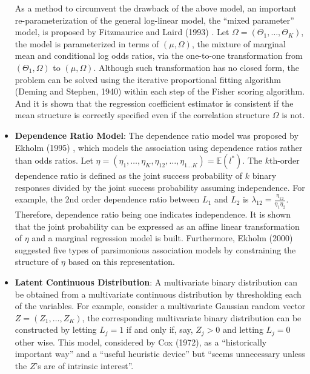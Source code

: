 \documentclass[11 pt, a4paper]{article}  %
\begin{document}
\begin{itemize}
As a method to circumvent the drawback of the above model, an important re-parameterization of the general log-linear model, the ``mixed parameter''  model, is proposed by Fitzmaurice and Laird (1993) \cite{fitzmaurice1993likelihood}. Let $\Omega = (\Theta_1,\ldots, \Theta_K)$, the model is parameterized in terms of $(\mu, \Omega)$, the mixture of marginal mean and conditional log odds ratios, via the one-to-one transformation from $(\Theta_1, \Omega)$ to $(\mu, \Omega)$. Although such transformation has no closed form, the problem can be solved  using the iterative proportional fitting algorithm (Deming and Stephen, 1940) \cite{deming1940least} within each step of the Fisher scoring algorithm. And it is shown that the regression coefficient estimator is consistent if the mean structure is correctly specified even if the correlation structure $\Omega$ is not.\\

\item {\bf Dependence Ratio Model}:
The dependence ratio model was proposed by Ekholm (1995) \cite{ekholm1995marginal}, which models the association using dependence ratios rather than odds ratios. Let $\eta = (\eta_1, \ldots, \eta_K, \eta_{12}, \ldots, \eta_{1\ldots K}) = \mathbb{E}(l^*)$.  The $k$th-order dependence ratio is defined as the joint success probability of $k$ binary responses divided by the joint success probability assuming independence. For example, the 2nd order dependence ratio between $L_1$ and $L_2$ is $\lambda_{12}=\frac{\eta_{12}}{\eta_1\eta_2}$. Therefore, dependence ratio being one indicates independence. It is shown that the joint probability can be expressed as an affine linear transformation of $\eta$ and a marginal regression model is built. Furthermore, Ekholm (2000) \cite{ekholm2000association} suggested five types of parsimonious association models by constraining the structure of $\eta$ based on this representation.\\


\item {\bf Latent Continuous Distribution}:
A multivariate binary distribution can be obtained from a multivariate continuous distribution by thresholding each of the variables. For example, consider a multivariate Gaussian random vector $Z=(Z_1,\ldots , Z_K)$, the corresponding multivariate binary distribution can be constructed by letting $L_j=1$ if and only if, say, $Z_j>0$ and letting $L_j=0$ other wise. This model, considered by Cox (1972), as a ``historically important way'' and a ``useful heuristic device'' but ``seems unnecessary unless the $Z$'s are of intrinsic interest''.   


\end{itemize}
\end{document}

